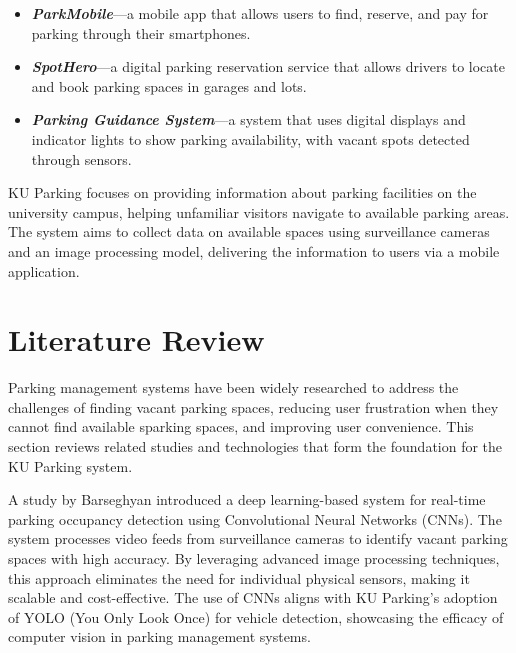 \begin{itemize}
    \item \textbf{\textit{ParkMobile}}---a mobile app that allows users to find, reserve, and pay for parking through their smartphones. \cite{ParkMobile_how_it_works}
    \item \textbf{\textit{SpotHero}}---a digital parking reservation service that allows drivers to locate and book parking spaces in garages and lots. \cite{SpotHero_how_SpotHero_works}
    \item \textbf{\textit{Parking Guidance System}}---a system that uses digital displays and indicator lights to show parking availability, with vacant spots detected through sensors. \cite{Parking_Guidance_Systems}
\end{itemize}
KU Parking focuses on providing information about parking facilities on the university campus, helping unfamiliar visitors navigate to available parking areas. The system aims to collect data on available spaces using surveillance cameras and an image processing model, delivering the information to users via a mobile application.

\section{Literature Review}
\label{section:literature-review}

Parking management systems have been widely researched to address the challenges of finding vacant parking spaces, 
reducing user frustration when they cannot find available sparking spaces, and improving user convenience. 
This section reviews related studies and technologies that form the foundation for the KU Parking system.

A study by Barseghyan \cite{barseghyan2023parking} introduced a deep learning-based system for real-time parking occupancy detection using Convolutional Neural Networks (CNNs). 
The system processes video feeds from surveillance cameras to identify vacant parking spaces with high accuracy. 
By leveraging advanced image processing techniques, this approach eliminates the need for individual physical sensors, making it scalable and cost-effective. 
The use of CNNs aligns with KU Parking's adoption of YOLO (You Only Look Once) for vehicle detection, showcasing the efficacy of computer vision in parking management systems.

